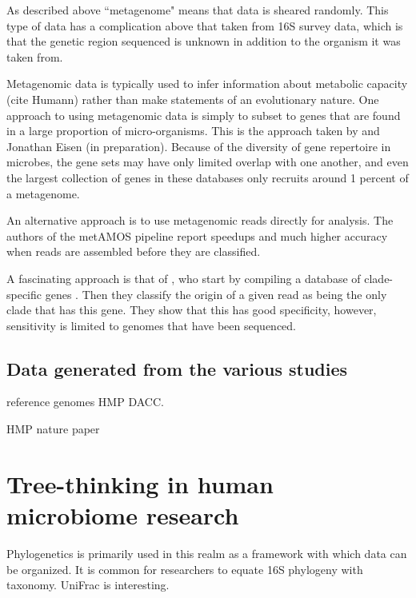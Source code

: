 \documentclass{amsart}
\begin{document}
As described above ``metagenome" means that data is sheared randomly.
This type of data has a complication above that taken from 16S survey data, which is that the genetic region sequenced is unknown in addition to the organism it was taken from.

Metagenomic data is typically used to infer information about metabolic capacity (cite Humann) rather than make statements of an evolutionary nature.
One approach to using metagenomic data is simply to subset to genes that are found in a large proportion of micro-organisms.
This is the approach taken by \citep{von2007quantitative,stark2010mltreemap} and Jonathan Eisen \citep{wu2008amphora} (in preparation).
Because of the diversity of gene repertoire in microbes, the gene sets may have only limited overlap with one another, and even the largest collection of genes in these databases only recruits around 1 percent of a metagenome.

An alternative approach is to use metagenomic reads directly for analysis.
The authors of the metAMOS pipeline \cite{treangen2013metamos} report speedups and much higher accuracy when reads are assembled before they are classified.

A fascinating approach is that of \citet{segata2012metagenomic}, who start by compiling a database of clade-specific genes \citep{segata2011metagenomic}.
Then they classify the origin of a given read as being the only clade that has this gene.
They show that this has good specificity, however, sensitivity is limited to genomes that have been sequenced.


\subsection{Data generated from the various studies}
reference genomes
HMP DACC.

HMP nature paper
\cite{methe2012framework}




\section{Tree-thinking in human microbiome research}

Phylogenetics is primarily used in this realm as a framework with which data can be organized.
It is common for researchers to equate 16S phylogeny with taxonomy.
UniFrac is interesting.
\end{document}
